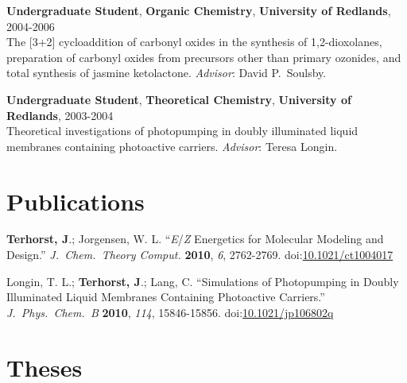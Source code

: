 \documentclass[10pt]{article}
\newcommand*\doilink[1]{\href{http://dx.doi.org/#1}{#1}}
\newcommand*\doi[1]{doi:\doilink{#1}}
\newcommand*\resitem[7]{\textbf{#1}, \textbf{#2}, \textbf{#3}, #4\\#5 \textit{#6}: #7}
\newcommand*\pubitem[7]{{#1} {``#2''} \textit{#3} \textbf{#4}, \textit{#5}, #6. \doi{#7}}
\begin{document}
\resitem{Undergraduate Student}{Organic Chemistry}{University of Redlands}{2004-2006}
{The [3+2] cycloaddition of carbonyl oxides in the synthesis of 1,2-dioxolanes, 
preparation of carbonyl oxides from precursors other than primary ozonides, 
and total synthesis of jasmine ketolactone.}{Advisor}{David P.\ Soulsby.}

\resitem{Undergraduate Student}{Theoretical Chemistry}{University of Redlands}{2003-2004}
{Theoretical investigations of photopumping in doubly illuminated liquid membranes containing photoactive carriers.}{Advisor}
{Teresa Longin.}


\section{Publications}


\pubitem{\textbf{Terhorst, J}.; Jorgensen, W. L.}
{\textit{E}/\textit{Z} Energetics for Molecular Modeling and Design.}
{J.\ Chem.\ Theory Comput.}
{2010}{6}%
{2762-2769}{10.1021/ct1004017}

\pubitem{Longin, T. L.; \textbf{Terhorst, J}.; Lang, C.}
{Simulations of Photopumping in Doubly Illuminated Liquid Membranes Containing Photoactive Carriers.}
{J.\ Phys.\ Chem.\ B}
{2010}{114}%
{15846-15856}{10.1021/jp106802q}


\section{Theses}

\end{document}
